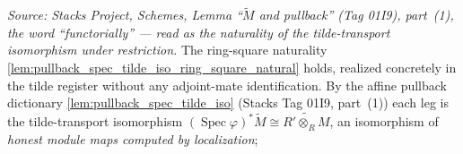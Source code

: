 \begin{lemma}

  \label{lem:pullback_spec_tilde_iso_ring_square_natural_concrete}
  \textit{Source: Stacks Project, Schemes, Lemma ``\(\widetilde M\) and pullback''
  (Tag 01I9), part~(1), the word ``functorially'' — read as the naturality of the
  tilde-transport isomorphism under restriction.}
  The ring-square naturality \cref{lem:pullback_spec_tilde_iso_ring_square_natural} holds, realized
  concretely in the tilde register without any adjoint-mate identification. By the affine pullback
  dictionary \cref{lem:pullback_spec_tilde_iso} (Stacks Tag 01I9, part~(1)) each leg is the
  tilde-transport isomorphism \((\operatorname{Spec}\varphi)^{*}\widetilde M \cong
  \widetilde{R' \otimes_R M}\), an isomorphism of \emph{honest module maps computed by localization};

\end{lemma}
